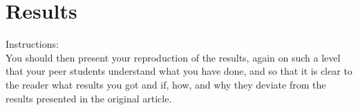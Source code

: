 \section{Results}
Instructions:\\
You should then present your reproduction of the results, again on such a level that your peer students understand what you have done, and so that it is clear to the reader what results you got and if, how, and why they deviate from the results presented in the original article.